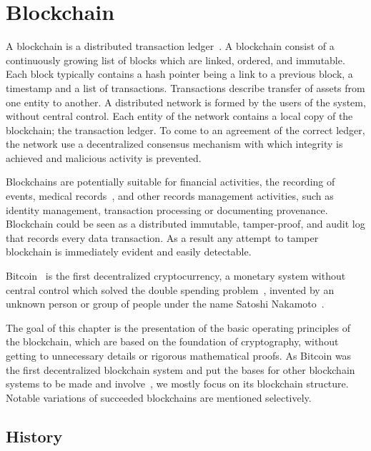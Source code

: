 \chapter{Blockchain}
\label{blockchain}

A blockchain is a distributed transaction ledger~\cite{nakamoto2012bitcoin}. A blockchain consist of a continuously growing list of blocks which are linked, ordered, and immutable. Each block typically contains a hash pointer being a link to a previous block, a timestamp and a list of transactions. Transactions describe transfer of assets from one entity to another. A distributed network is formed by the users of the system, without central control. Each entity of the network contains a local copy of the blockchain; the transaction ledger. To come to an agreement of the correct ledger, the network use a decentralized consensus mechanism with which integrity is achieved and malicious activity is prevented.

Blockchains are potentially suitable for financial activities, the recording of events, medical records~\cite{blockchain_ehr,Azaria2016}, and other records management activities, such as identity management, transaction processing or documenting provenance. Blockchain could be seen as a distributed immutable, tamper-proof, and audit log that records every data transaction. As a result any attempt to tamper blockchain is immediately evident and easily detectable.

Bitcoin~\cite{nakamoto2012bitcoin} is the first decentralized cryptocurrency, a monetary system without central control which solved the double spending problem~\cite{double_spent, nakamoto2012bitcoin}, invented by an unknown person or group of people under the name Satoshi Nakamoto~\cite{nakamoto2012bitcoin}.

The goal of this chapter is the presentation of the basic operating principles of the blockchain, which are based on the foundation of cryptography, without getting to unnecessary details or rigorous mathematical proofs. As Bitcoin was the first decentralized blockchain system and put the bases for other blockchain systems to be made and involve~\cite{7163021,10.1007/978-3-662-46803-6_10, ethereum_whitepaper}, we mostly focus on its blockchain structure. Notable variations of succeeded blockchains are mentioned selectively.

\section{History}\label{blockchain:history}

